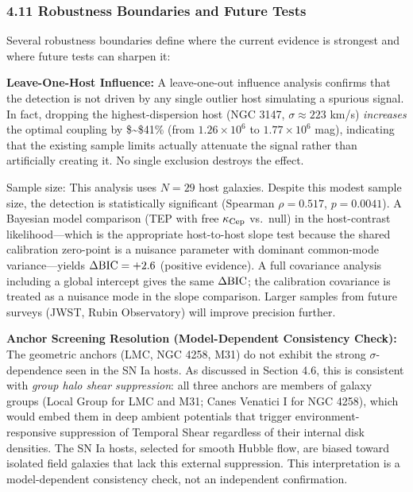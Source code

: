 \documentclass[
]{article}
\begin{document}
\subsubsection{4.11 Robustness Boundaries and Future
Tests}\label{robustness-boundaries-and-future-tests}

Several robustness boundaries define where the current evidence is
strongest and where future tests can sharpen it:

\textbf{Leave-One-Host Influence:} A leave-one-out influence analysis
confirms that the detection is not driven by any single outlier host
simulating a spurious signal. In fact, dropping the highest-dispersion
host (NGC 3147, \(\sigma \approx 223\) km/s) \emph{increases} the
optimal coupling by \$\sim\$41\% (from \(1.26 \times 10^6\) to
\(1.77 \times 10^6\) mag), indicating that the existing sample limits
actually attenuate the signal rather than artificially creating it. No
single exclusion destroys the effect.

Sample size: This analysis uses \(N=29\) host galaxies. Despite this
modest sample size, the detection is statistically significant (Spearman
\(\rho = 0.517\), \(p = 0.0041\)). A Bayesian model comparison (TEP with
free \(\kappa_{\rm Cep}\) vs.~null) in the host-contrast
likelihood---which is the appropriate host-to-host slope test because
the shared calibration zero-point is a nuisance parameter with dominant
common-mode variance---yields \(\Delta{\rm BIC} = +2.6\) (positive
evidence). A full covariance analysis including a global intercept gives
the same \(\Delta{\rm BIC}\); the calibration covariance is treated as a
nuisance mode in the slope comparison. Larger samples from future
surveys (JWST, Rubin Observatory) will improve precision further.

\textbf{Anchor Screening Resolution (Model-Dependent Consistency
Check):} The geometric anchors (LMC, NGC 4258, M31) do not exhibit the
strong \(\sigma\)-dependence seen in the SN Ia hosts. As discussed in
Section 4.6, this is consistent with \emph{group halo shear
suppression}: all three anchors are members of galaxy groups (Local
Group for LMC and M31; Canes Venatici I for NGC 4258), which would embed
them in deep ambient potentials that trigger environment-responsive
suppression of Temporal Shear regardless of their internal disk
densities. The SN Ia hosts, selected for smooth Hubble flow, are biased
toward isolated field galaxies that lack this external suppression. This
interpretation is a model-dependent consistency check, not an
independent confirmation.
\end{document}
